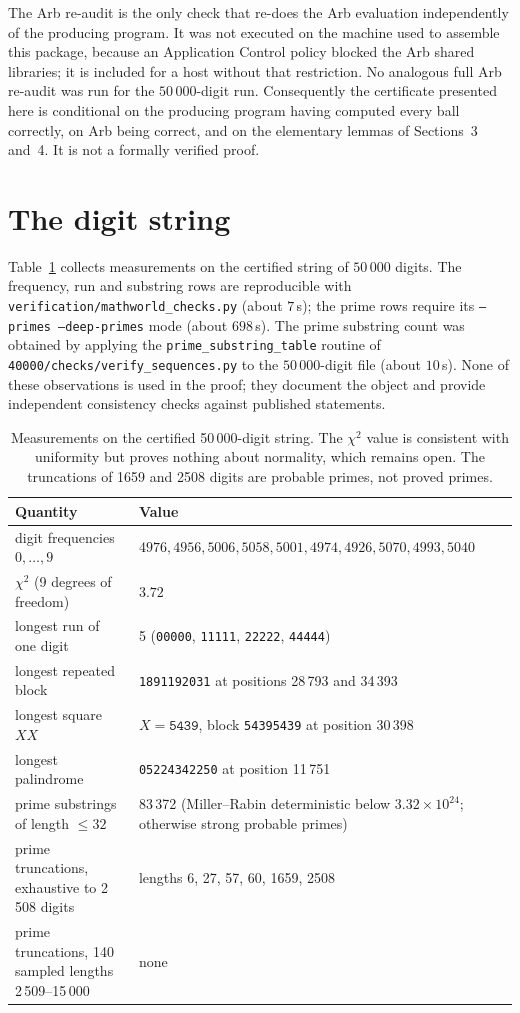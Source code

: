\documentclass[11pt,a4paper]{article}
\theoremstyle{remark}
\begin{document}
The Arb re-audit is the only check that re-does the Arb evaluation
independently of the producing program. It was not executed on the
machine used to assemble this package, because an Application Control
policy blocked the Arb shared libraries; it is included for a host
without that restriction. No analogous full Arb re-audit was run for the
$50\,000$-digit run. Consequently the certificate presented here is
conditional on the producing program having computed every ball
correctly, on Arb being correct, and on the elementary lemmas of
Sections~3 and~4. It is not a formally verified proof.

\section{The digit string}

Table~\ref{tab:digits} collects measurements on the certified string of
$50\,000$ digits. The frequency, run and substring rows are reproducible
with \texttt{verification/mathworld\_checks.py} (about $7$\,s); the prime
rows require its \texttt{--primes --deep-primes} mode (about $698$\,s).
The prime substring count was obtained by applying the
\texttt{prime\_substring\_table} routine of
\texttt{40000/checks/verify\_sequences.py} to the $50\,000$-digit file
(about $10$\,s). None of these observations is used in the proof; they
document the object and provide independent consistency checks against
published statements.

\begin{table}[ht]
\centering
\small
\begin{tabular}{@{}p{}p{}@{}}
\toprule
Quantity & Value \\
\midrule
digit frequencies $0,\ldots,9$ &
  $4976,4956,5006,5058,5001,4974,4926,5070,4993,5040$ \\
$\chi^2$ (9 degrees of freedom) & $3.72$ \\
longest run of one digit & 5 (\texttt{00000}, \texttt{11111}, \texttt{22222}, \texttt{44444}) \\
longest repeated block & \texttt{1891192031} at positions 28\,793 and 34\,393 \\
longest square $XX$ & $X=\texttt{5439}$, block \texttt{54395439} at position 30\,398 \\
longest palindrome & \texttt{05224342250} at position 11\,751 \\
prime substrings of length $\le32$ & 83\,372 (Miller--Rabin deterministic below $3.32\times10^{24}$; otherwise strong probable primes) \\
prime truncations, exhaustive to 2\,508 digits & lengths 6, 27, 57, 60, 1659, 2508 \\
prime truncations, 140 sampled lengths 2\,509--15\,000 & none \\
\bottomrule
\end{tabular}
\caption{Measurements on the certified 50\,000-digit string. The
$\chi^2$ value is consistent with uniformity but proves nothing about
normality, which remains open. The truncations of 1659 and 2508 digits
are probable primes, not proved primes.}
\label{tab:digits}
\end{table}
\end{document}
